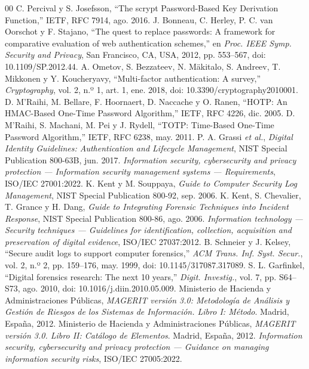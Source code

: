 \documentclass[conference]{IEEEtran}
\begin{document}
\begin{thebibliography}{00}
 C. Percival y S. Josefsson, ``The scrypt Password-Based Key Derivation Function,'' IETF, RFC 7914, ago. 2016.
 J. Bonneau, C. Herley, P. C. van Oorschot y F. Stajano, ``The quest to replace passwords: A framework for comparative evaluation of web authentication schemes,'' en \textit{Proc. IEEE Symp. Security and Privacy}, San Francisco, CA, USA, 2012, pp. 553--567, doi: 10.1109/SP.2012.44.
 A. Ometov, S. Bezzateev, N. Mäkitalo, S. Andreev, T. Mikkonen y Y. Koucheryavy, ``Multi-factor authentication: A survey,'' \textit{Cryptography}, vol. 2, n.º 1, art. 1, ene. 2018, doi: 10.3390/cryptography2010001.
 D. M'Raihi, M. Bellare, F. Hoornaert, D. Naccache y O. Ranen, ``HOTP: An HMAC-Based One-Time Password Algorithm,'' IETF, RFC 4226, dic. 2005.
 D. M'Raihi, S. Machani, M. Pei y J. Rydell, ``TOTP: Time-Based One-Time Password Algorithm,'' IETF, RFC 6238, may. 2011.
 P. A. Grassi \textit{et al.}, \textit{Digital Identity Guidelines: Authentication and Lifecycle Management}, NIST Special Publication 800-63B, jun. 2017.
 \textit{Information security, cybersecurity and privacy protection --- Information security management systems --- Requirements}, ISO/IEC 27001:2022.
 K. Kent y M. Souppaya, \textit{Guide to Computer Security Log Management}, NIST Special Publication 800-92, sep. 2006.
 K. Kent, S. Chevalier, T. Grance y H. Dang, \textit{Guide to Integrating Forensic Techniques into Incident Response}, NIST Special Publication 800-86, ago. 2006.
 \textit{Information technology --- Security techniques --- Guidelines for identification, collection, acquisition and preservation of digital evidence}, ISO/IEC 27037:2012.
 B. Schneier y J. Kelsey, ``Secure audit logs to support computer forensics,'' \textit{ACM Trans. Inf. Syst. Secur.}, vol. 2, n.º 2, pp. 159--176, may. 1999, doi: 10.1145/317087.317089.
 S. L. Garfinkel, ``Digital forensics research: The next 10 years,'' \textit{Digit. Investig.}, vol. 7, pp. S64--S73, ago. 2010, doi: 10.1016/j.diin.2010.05.009.
 Ministerio de Hacienda y Administraciones Públicas, \textit{MAGERIT versión 3.0: Metodología de Análisis y Gestión de Riesgos de los Sistemas de Información. Libro I: Método}. Madrid, España, 2012.
 Ministerio de Hacienda y Administraciones Públicas, \textit{MAGERIT versión 3.0. Libro II: Catálogo de Elementos}. Madrid, España, 2012.
 \textit{Information security, cybersecurity and privacy protection --- Guidance on managing information security risks}, ISO/IEC 27005:2022.

\end{thebibliography}
\end{document}
